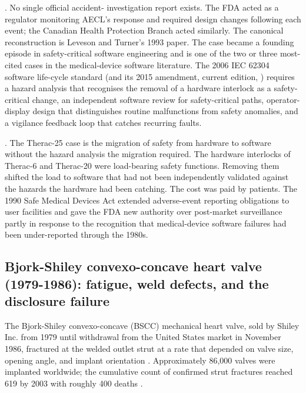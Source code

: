 . No single official accident-
investigation report exists. The FDA acted as a regulator monitoring
AECL's response and required design changes following each event;
the Canadian Health Protection Branch acted similarly. The
canonical reconstruction is Leveson and Turner's 1993 paper. The
case became a founding episode in safety-critical software
engineering and is one of the two or three most-cited cases in the
medical-device software literature. The 2006 IEC 62304 software
life-cycle standard (and its 2015 amendment, current edition,
\cite{std:v6c12-iec-62304-2015}) requires a hazard analysis that
recognises the removal of a hardware interlock as a safety-critical
change, an independent software review for safety-critical paths,
operator-display design that distinguishes routine malfunctions
from safety anomalies, and a vigilance feedback loop that catches
recurring faults.

. The Therac-25 case is the
migration of safety from hardware to software without the hazard
analysis the migration required. The hardware interlocks of
Therac-6 and Therac-20 were load-bearing safety functions.
Removing them shifted the load to software that had not been
independently validated against the hazards the hardware had been
catching. The cost was paid by patients. The 1990 Safe Medical
Devices Act \cite{law:v6c12-safe-medical-devices-act-1990}
extended adverse-event reporting obligations to user facilities
and gave the FDA new authority over post-market surveillance
partly in response to the recognition that medical-device software
failures had been under-reported through the 1980s.

\subsection{Bjork-Shiley convexo-concave heart valve (1979-1986): fatigue, weld defects, and the disclosure failure}

The Bjork-Shiley convexo-concave (BSCC) mechanical heart valve,
sold by Shiley Inc. from 1979 until withdrawal from the United
States market in November 1986, fractured at the welded outlet
strut at a rate that depended on valve size, opening angle, and
implant orientation \cite{acc:bjork-shiley-cc-1979-1986,
paper:v6c12-blot-bjork-shiley-2005,
web:v6c12-fda-bjork-shiley-1992-recall}. Approximately 86,000
valves were implanted worldwide; the cumulative count of confirmed
strut fractures reached 619 by 2003 with roughly 400 deaths
\cite{paper:v6c12-blot-bjork-shiley-2005}.

